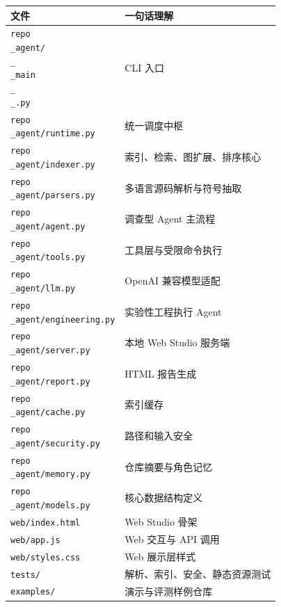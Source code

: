 \documentclass[UTF8,12pt,openany]{ctexbook}
\begin{document}
\begin{center}
\small
\begin{longtable}{|p{}|p{}|}
\toprule
文件 & 一句话理解 \\
\midrule
\texttt{repo\\_agent/\\_\\_main\\_\\_.py} & CLI 入口 \\
\texttt{repo\\_agent/runtime.py} & 统一调度中枢 \\
\texttt{repo\\_agent/indexer.py} & 索引、检索、图扩展、排序核心 \\
\texttt{repo\\_agent/parsers.py} & 多语言源码解析与符号抽取 \\
\texttt{repo\\_agent/agent.py} & 调查型 Agent 主流程 \\
\texttt{repo\\_agent/tools.py} & 工具层与受限命令执行 \\
\texttt{repo\\_agent/llm.py} & OpenAI 兼容模型适配 \\
\texttt{repo\\_agent/engineering.py} & 实验性工程执行 Agent \\
\texttt{repo\\_agent/server.py} & 本地 Web Studio 服务端 \\
\texttt{repo\\_agent/report.py} & HTML 报告生成 \\
\texttt{repo\\_agent/cache.py} & 索引缓存 \\
\texttt{repo\\_agent/security.py} & 路径和输入安全 \\
\texttt{repo\\_agent/memory.py} & 仓库摘要与角色记忆 \\
\texttt{repo\\_agent/models.py} & 核心数据结构定义 \\
\texttt{web/index.html} & Web Studio 骨架 \\
\texttt{web/app.js} & Web 交互与 API 调用 \\
\texttt{web/styles.css} & Web 展示层样式 \\
\texttt{tests/} & 解析、索引、安全、静态资源测试 \\
\texttt{examples/} & 演示与评测样例仓库 \\
\bottomrule
\end{longtable}
\end{center}
\end{document}
